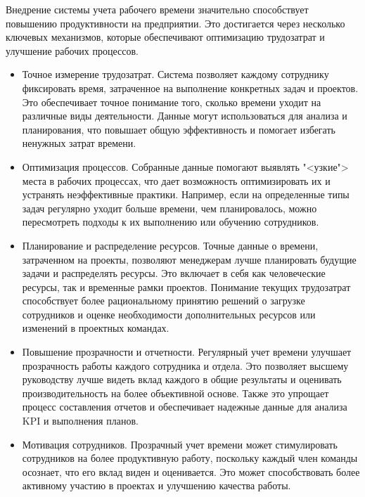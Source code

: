 Внедрение системы учета рабочего времени значительно способствует повышению продуктивности на предприятии. Это достигается через несколько ключевых механизмов, которые обеспечивают оптимизацию трудозатрат и улучшение рабочих процессов.

\begin{itemize}
\item Точное измерение трудозатрат. Система позволяет каждому сотруднику фиксировать время, затраченное на выполнение конкретных задач и проектов. Это обеспечивает точное понимание того, сколько времени уходит на различные виды деятельности. Данные могут использоваться для анализа и планирования, что повышает общую эффективность и помогает избегать ненужных затрат времени.

\item Оптимизация процессов. Собранные данные помогают выявлять "<узкие"> места в рабочих процессах, что дает возможность оптимизировать их и устранять неэффективные практики. Например, если на определенные типы задач регулярно уходит больше времени, чем планировалось, можно пересмотреть подходы к их выполнению или обучению сотрудников.

\item Планирование и распределение ресурсов. Точные данные о времени, затраченном на проекты, позволяют менеджерам лучше планировать будущие задачи и распределять ресурсы. Это включает в себя как человеческие ресурсы, так и временные рамки проектов. Понимание текущих трудозатрат способствует более рациональному принятию решений о загрузке сотрудников и оценке необходимости дополнительных ресурсов или изменений в проектных командах.

\item Повышение прозрачности и отчетности. Регулярный учет времени улучшает прозрачность работы каждого сотрудника и отдела. Это позволяет высшему руководству лучше видеть вклад каждого в общие результаты и оценивать производительность на более объективной основе. Также это упрощает процесс составления отчетов и обеспечивает надежные данные для анализа KPI и выполнения планов.

\item Мотивация сотрудников. Прозрачный учет времени может стимулировать сотрудников на более продуктивную работу, поскольку каждый член команды осознает, что его вклад виден и оценивается. Это может способствовать более активному участию в проектах и улучшению качества работы.
\end{itemize}

